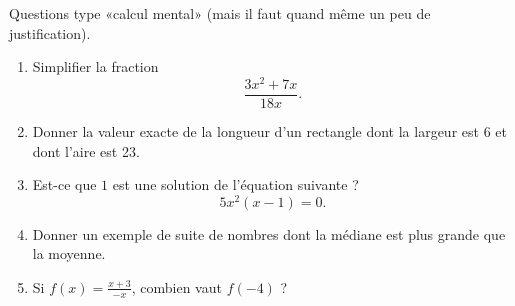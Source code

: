 
\begin{exercice}\label{exosmath-0571}

    Questions type «calcul mental» (mais il faut quand même un peu de justification).
    \begin{enumerate}
        \item
            Simplifier la fraction
            \begin{equation*}
                \frac{ 3x^2+7x }{ 18x }.
            \end{equation*}
        \item
            Donner la valeur exacte de la longueur d'un rectangle dont la largeur est \unit{6}{\centi\meter} et dont l'aire est \unit{23}{\centi\square\meter}.
        \item
            Est-ce que \( 1\) est une solution de l'équation suivante ?
            \begin{equation*}
                5x^2(x-1)=0.
            \end{equation*}
        \item
            Donner un exemple de suite de nombres dont la médiane est plus grande que la moyenne.
        \item 
            Si \( f(x)=\frac{ \displaystyle x+3 }{ \displaystyle -x }\), combien vaut \( f(-4)\) ?
    \end{enumerate}

\end{exercice}

